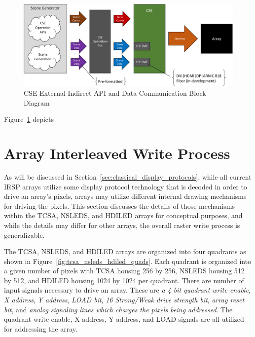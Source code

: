     \begin{figure}
        \centering
        \includegraphics[width=1.0\textwidth]{fig/external_cse_comm_indirect.pdf}
        \caption{CSE External Indirect API and Data Communication Block Diagram}
        \label{fig:external_cse_comm_indirect}
    \end{figure}

    Figure~\ref{fig:external_cse_comm_indirect} depicts

\section{Array Interleaved Write Process}
    \label{sec:array_Interleaved_write_process}
    As will be discussed in Section~\ref{sec:classical_display_protocols}, while all current IRSP arrays utilize some display protocol technology that is decoded in order to drive an array's pixels, arrays may utilize different internal drawing mechanisms for driving the pixels. This section discusses the details of those mechanisms within the TCSA, NSLEDS, and HDILED arrays for conceptual purposes, and while the details may differ for other arrays, the overall raster write process is generalizable.

    The TCSA, NSLEDS, and HDILED arrays are organized into four quadrants as shown in Figure~\ref{fig:tcsa_nsleds_hdiled_quads}. Each quadrant is organized into a given number of pixels with TCSA housing 256 by 256, NSLEDS housing 512 by 512, and HDILED housing 1024 by 1024 per quadrant. There are number of input signals necessary to drive an array. These are {\em a 4 bit quadrant write enable}, {\em X address}, {\em Y address}, {\em LOAD bit}, {\em 16 Strong/Weak drive strength bit}, {\em array reset bit}, and {\em analog signaling lines which charges the pixels being addressed}. The quadrant write enable, X address, Y address, and LOAD signals are all utilized for addressing the array.

